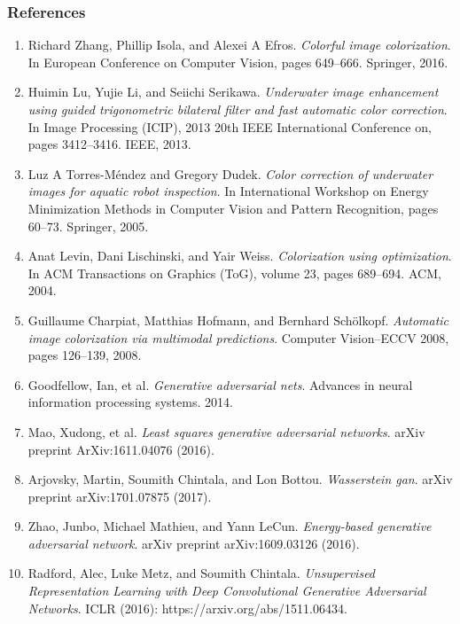 \documentclass{beamer}
\begin{document}


\begin{frame}
\frametitle{\textbf{References}}
\tiny
\begin{enumerate}
\item Richard Zhang, Phillip Isola, and Alexei A Efros. \textit{Colorful image colorization}. In European Conference on Computer Vision,
pages 649–666. Springer, 2016.
\item Huimin Lu, Yujie Li, and Seiichi Serikawa. \textit{Underwater image enhancement using guided trigonometric bilateral filter and fast
automatic color correction}. In Image Processing (ICIP), 2013 20th IEEE International Conference on, pages 3412–3416. IEEE, 2013.
\item Luz A Torres-Méndez and Gregory Dudek. \textit{Color correction of underwater images for aquatic robot inspection}. In International
Workshop on Energy Minimization Methods in Computer Vision and Pattern Recognition, pages 60–73. Springer, 2005.
\item Anat Levin, Dani Lischinski, and Yair Weiss. \textit{Colorization using optimization}. In ACM Transactions on Graphics (ToG), volume 23, pages 689–694. ACM, 2004.
\item Guillaume Charpiat, Matthias Hofmann, and Bernhard Schölkopf. \textit{Automatic image colorization via multimodal predictions}. Computer Vision–ECCV 2008, pages 126–139, 2008.
\item Goodfellow, Ian, et al. \textit{Generative adversarial nets}. Advances in neural information processing systems. 2014.
\item Mao, Xudong, et al. \textit{Least squares generative adversarial networks}. arXiv preprint ArXiv:1611.04076 (2016).
\item Arjovsky, Martin, Soumith Chintala, and Lon Bottou. \textit{Wasserstein gan}. arXiv preprint arXiv:1701.07875 (2017).
\item Zhao, Junbo, Michael Mathieu, and Yann LeCun. \textit{Energy-based generative adversarial network}. arXiv preprint arXiv:1609.03126 (2016).
\item Radford, Alec, Luke Metz, and Soumith Chintala. \textit{Unsupervised Representation Learning with Deep Convolutional Generative Adversarial Networks}. ICLR (2016): https://arxiv.org/abs/1511.06434.










\end{enumerate}
\end{frame}
\end{document}
